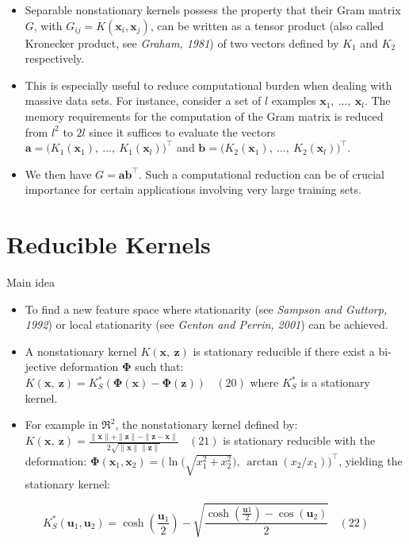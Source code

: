 \documentclass[
  ignorenonframetext,
]{beamer}
\begin{document}
\begin{frame}{}
\protect\hypertarget{section-16}{}
\begin{itemize}
\item
  Separable nonstationary kernels possess the property that their Gram
  matrix \(G\), with \(G_{ij}=K(\pmb x_i, \pmb x_j)\), can be written as
  a tensor product (also called Kronecker product, see \emph{Graham,
  1981}) of two vectors defined by \(K_1\) and \(K_2\) respectively.
\item
  This is especially useful to reduce computational burden when dealing
  with massive data sets. For instance, consider a set of \(l\) examples
  \(\pmb x_1,\ ... ,\ \pmb x_l\). The memory requirements for the
  computation of the Gram matrix is reduced from \(l^2\) to \(2l\) since
  it suffices to evaluate the vectors
  \(\pmb a=\big(K_1(\pmb x_1),\ ...,\ K_1(\pmb x_l)\big)^{\top}\) and
  \(\pmb b=\big(K_2(\pmb x_1),\ ...,\ K_2(\pmb x_l)\big)^{\top}\).
\item
  We then have \(G = \pmb{ab}^{\top}\). Such a computational reduction
  can be of crucial importance for certain applications involving very
  large training sets.
\end{itemize}
\end{frame}

\hypertarget{reducible-kernels}{%
\section{Reducible Kernels}\label{reducible-kernels}}

\begin{frame}{Main idea}
\protect\hypertarget{main-idea}{}
\begin{itemize}
\item
  To find a new feature space where stationarity (see \emph{Sampson and
  Guttorp, 1992}) or local stationarity (see \emph{Genton and Perrin,
  2001}) can be achieved.
\item
  A nonstationary kernel \(K(\pmb x,\ \pmb z)\) is stationary reducible
  if there exist a bi-jective deformation \(\pmb \Phi\) such that:
  \(K(\pmb x,\ \pmb z) = K_S^*(\pmb\Phi(\pmb x) - \pmb\Phi(\pmb z))\ \ \ \ (20)\)
  where \(K_S^*\) is a stationary kernel.
\item
  For example in \(\mathfrak R^2\), the nonstationary kernel defined by:
  \(K(\pmb x,\ \pmb z) = \frac {\|\pmb x\| + \|\pmb z\| - \|\pmb z - \pmb x\|}{2 \sqrt{\|\pmb x\|\|\pmb z\|}} \ \ \ \ (21)\)
  is stationary reducible with the deformation:
  \(\pmb \Phi(\pmb x_1, \pmb x_2) = \bigg(\ln\Big(\sqrt {x^2_1+x^2_2}\Big),\ \arctan(x_2/x_1)\bigg)^{\top}\),
  yielding the stationary kernel:
\end{itemize}

\[
K_S^*(\pmb u_1, \pmb u_2) = \cosh(\frac{\pmb u_1} 2) - \sqrt{\frac {\cosh(\frac {\pmb u1} 2) - \cos(\pmb u_2)} 2} \ \ \ \ (22)
\]
\end{frame}
\end{document}
